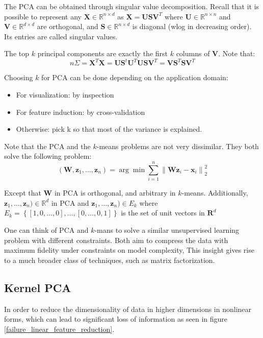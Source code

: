 \documentclass[a4paper,10pt,twoside]{article}
\newcommand\norm[1]{\left\lVert#1\right\rVert}
\begin{document}
The PCA can be obtained through singular value decomposition. Recall that it is possible to represent any $\mathbf{X}\in\mathbb{R}^{n\times d}$ as $\mathbf{X=USV}^T$ where $\mathbf{U}\in\mathbb{R}^{n\times n}$ and $\mathbf{V}\in\mathbb{R}^{d\times d}$ are orthogonal, and $\mathbf{S}\in\mathbb{R}^{n\times d}$ is diagonal (wlog in decreasing order). Its entries are called singular values.

The top $k$ principal components are exactly the first $k$ columns of $\mathbf{V}$. Note that:
\begin{equation}
    n\Sigma=\mathbf{X}^T\mathbf{X}=\mathbf{US}^t\mathbf{U}^T\mathbf{USV}^T=\mathbf{VS}^T\mathbf{SV}^T
\end{equation}

Choosing $k$ for PCA can be done depending on the application domain:
\begin{itemize}
    \item For visualization: by inspection
    \item For feature induction: by cross-validation
    \item Otherwise: pick k so that most of the variance is explained.
\end{itemize}

Note that the PCA and the $k$-means problems are not very dissimilar. They both solve the following problem:
\begin{equation*}
    (\mathbf{W}, \mathbf{z}_1, \ldots, \mathbf{z}_n)=\arg\min\sum_{i=1}^{n}\norm{\mathbf{W}\mathbf{z}_i-\mathbf{x}_i}^2_2
\end{equation*}

Except that $\mathbf{W}$ in PCA is orthogonal, and arbitrary in $k$-means.
Additionally, $\mathbf{z}_1, \ldots, \mathbf{z}_n)\in\mathbb{R}^{d}$ in PCA and $\mathbf{z}_1, \ldots, \mathbf{z}_n)\in E_k$ where $E_k=\left\{[1,0,\ldots, 0],\ldots, [0,\ldots, 0, 1]\right\}$ is the set of unit vectors in $\mathbf{R}^d$

One can think of PCA and $k$-mans to solve a similar unsupervised learning problem with different constraints. Both aim to compress the data with maximum fidelity under constraints on model complexity, This insight gives rise to a much broader class of techniques, such as matrix factorization.

\subsection{Kernel PCA}

In order to reduce the dimensionality of data in higher dimensions in nonlinear forms, which can lead to significant loss of information as seen in figure \ref{failure_linear_feature_reduction}.
\end{document}
